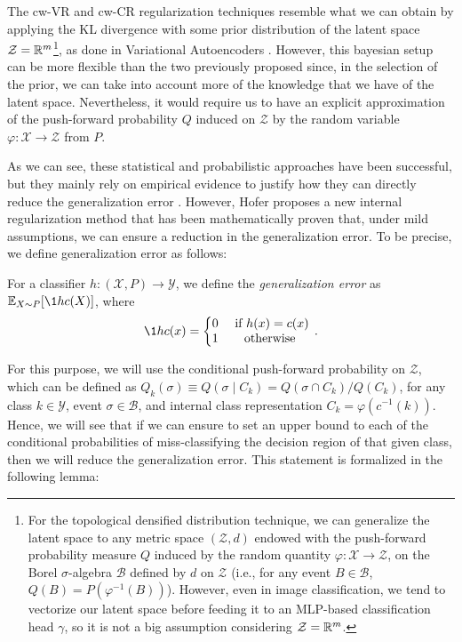 \documentclass[../main.tex]{subfiles}
\begin{document}
\begin{remark}
The cw-VR and cw-CR regularization techniques resemble what we can obtain by applying the KL divergence with some prior distribution of the latent space  $\mathcal{Z}=\mathbb{R}^m$\footnote{For the topological densified distribution technique, we can generalize the latent space to any metric space $(\mathcal{Z}, d)$ endowed with the push-forward probability measure $Q$ induced by the random quantity $\varphi: \mathcal{X} \to \mathcal{Z}$, on the Borel $\sigma$-algebra $\mathcal{B}$ defined by $d$ on $\mathcal{Z}$ (i.e., for any event $B\in \mathcal{B}$, $Q(B)= P(\varphi^{-1}(B))$). However, even in image classification, we tend to vectorize our latent space before feeding it to an MLP-based classification head $\gamma$, so it is not a big assumption considering $\mathcal{Z}=\mathbb{R}^m$.}, as done in Variational Autoencoders \cite{kingma_auto-encoding_2022}. However, this bayesian setup can be more flexible than the two previously proposed since, in the selection of the prior, we can take into account more of the knowledge that we have of the latent space. Nevertheless, it would require us to have an explicit approximation of the push-forward probability $Q$ induced on $\mathcal{Z}$ by the random variable $\varphi: \mathcal{X} \to \mathcal{Z}$ from $P$.
\end{remark}

As we can see, these statistical and probabilistic approaches have been successful, but they mainly rely  on empirical evidence to justify how they can directly reduce the generalization error \cite{hofer_densified_2021}. However, Hofer \etal \cite{hofer_densified_2021} proposes a new internal regularization method that has been mathematically proven that, under mild assumptions, we can ensure a reduction in the generalization error. To be precise, we define generalization error as follows:

\begin{definition}
For a classifier $h: (\mathcal{X}, P) \to \mathcal{Y}$, we define the \emph{generalization error} as $\E_{X \sim P}[\1{h}{c}(X)]$, where 
\[
\1{h}{c}(x) = \left\{\begin{matrix}
0 & \text{ if } h(x)=c(x)\\
1 &  \text{ otherwise }\\
\end{matrix}\right.\,.
\]
\end{definition}

For this purpose, we will use the conditional push-forward probability on $\mathcal{Z}$, which can be defined as $Q_k(\sigma)\equiv Q(\sigma \mid C_k) = Q(\sigma \cap C_k)/Q(C_k)$, for any class $k\in \mathcal{Y}$, event $\sigma \in \mathcal{B}$, and internal class representation $C_k=\varphi(c^{-1}(k))$. Hence, we will see that if we can ensure to set an upper bound to each of the conditional probabilities of miss-classifying the decision region of that given class, then we will reduce the generalization error. This statement is formalized in the following lemma:
\end{document}
